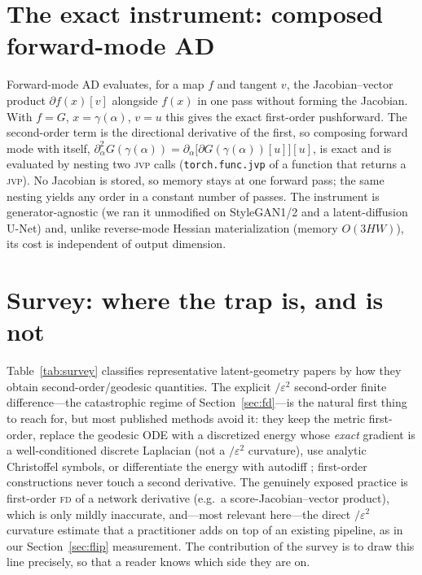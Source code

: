 \documentclass[11pt]{article}
\newcommand{\jvp}{\textsc{jvp}}
\newcommand{\fd}{\textsc{fd}}
\newcommand{\eps}{\varepsilon}
\begin{document}
\section{The exact instrument: composed forward-mode AD}
\label{sec:method}
Forward-mode AD evaluates, for a map $f$ and tangent $v$, the
Jacobian--vector product $\partial f(x)[v]$ alongside $f(x)$ in one pass without
forming the Jacobian. With $f=G$, $x=\gamma(\alpha)$, $v=u$ this gives the exact
first-order pushforward. The second-order term is the directional derivative of
the first, so composing forward mode with itself,
$\partial^2_\alpha G(\gamma(\alpha))=\partial_\alpha\big[\partial
G(\gamma(\alpha))[u]\big][u]$, is exact and is evaluated by nesting two \jvp{}
calls (\texttt{torch.func.jvp} of a function that returns a \jvp). No Jacobian is
stored, so memory stays at one forward pass; the same nesting yields any order in
a constant number of passes. The instrument is generator-agnostic (we ran it
unmodified on StyleGAN1/2 and a latent-diffusion U-Net) and, unlike reverse-mode
Hessian materialization (memory $O(3HW)$), its cost is independent of output
dimension.

\section{Survey: where the trap is, and is not}
\label{sec:survey}
Table~\ref{tab:survey} classifies representative latent-geometry papers by how
they obtain second-order/geodesic quantities. The explicit $/\eps^2$ second-order
finite difference---the catastrophic regime of Section~\ref{sec:fd}---is the
natural first thing to reach for, but most published methods avoid it: they keep
the metric first-order, replace the geodesic ODE with a discretized energy whose
\emph{exact} gradient is a well-conditioned discrete Laplacian (not a $/\eps^2$
curvature), use analytic Christoffel symbols, or differentiate the energy with
autodiff \citep{yang2018}; first-order constructions \citep{park2023,chen2018,kwon2023}
never touch a second derivative. The genuinely exposed practice is first-order \fd{} of a network
derivative (e.g.\ a score-Jacobian--vector product), which is only mildly
inaccurate, and---most relevant here---the direct $/\eps^2$ curvature estimate
that a practitioner adds on top of an existing pipeline, as in our
Section~\ref{sec:flip} measurement. The contribution of the survey is to draw
this line precisely, so that a reader knows which side they are on.
\end{document}
